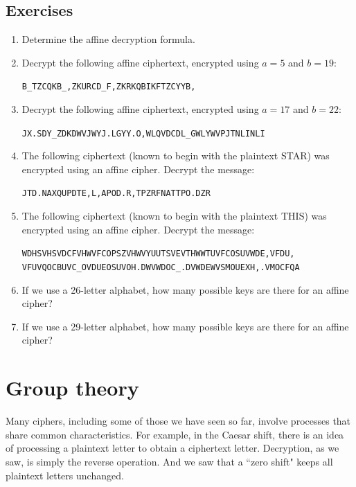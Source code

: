 \documentclass{book}
\theoremstyle{plain}
\theoremstyle{definition}
\newif\ifprintsolutions
\newcommand{\solution}[1]{\ifprintsolutions \begin{sloppypar}{\it #1}\end{sloppypar} \fi} %
\newcommand{\display}[1]{\begin{sloppypar}\setlength{\parindent}{0mm}#1\end{sloppypar}} %
\newcommand{\ciphertextspace}[1]{\begin{sloppypar}\doublespacing\Large\texttt{#1}\end{sloppypar}} %
\renewcommand{\mod}{\operatorname{mod}}
\renewcommand{\mod}{\operatorname{mod}}
\begin{document}
\section{Exercises}
\begin{enumerate}
\item Determine the affine decryption formula. \solution{$P \equiv a^{-1}(C-b) \mod 29$}
\item Decrypt the following affine ciphertext, encrypted using $a = 5$ and $b = 19$:
\display{\ciphertextspace{B\_TZCQKB\_,ZKURCD\_F,ZKRKQBIKFTZCYYB,}} \solution{In a hole in the ground there lived a hobbit.}
\item Decrypt the following affine ciphertext, encrypted using $a = 17$ and $b = 22$:
\display{\ciphertextspace{JX.SDY\_ZDKDWVJWYJ.LGYY.O,WLQVDCDL\_GWLYWVPJTNLINLI}} \solution{Smokey the bear says only you can prevent lanyard swinging.}
\item The following ciphertext (known to begin with the plaintext STAR) was encrypted using an affine cipher. Decrypt the message:
\display{\ciphertextspace{JTD.NAXQUPDTE,L,APOD.R,TPZRFNATTPO.DZR}} \solution{Key $a = 10, b = 3$: Starbuck, what do you hear? Nothing but the rain.}
\item The following ciphertext (known to begin with the plaintext THIS) was encrypted using an affine cipher. Decrypt the message:
\display{\ciphertextspace{WDHSVHSVDCFVHWVFCOPSZVHWVYUUTSVEVTHWWTUVFCOSUVWDE,VFDU,\\VFUVQOCBUVC\_OVDUEOSUVOH.DWVWDOC\_.DVWDEWVSMOUEXH,.VMOCFQA}} \solution{Key $a = b = 4$: This is how it works, it feels a little worse than when we drove our hearse right through that screaming crowd.}
\item If we use a 26-letter alphabet, how many possible keys are there for an affine cipher? \solution{Using the algorithm $C \equiv aP+b \mod 26$, we have $a \in \{1,3,5,7,9,11,15,17,19,21,23,25\}$ and $b \in \{0,\ldots,25\}$, so there are $12 \times 26 = 312$ keys.}
\item If we use a 29-letter alphabet, how many possible keys are there for an affine cipher? \solution{Using the algorithm $C \equiv aP+b \mod 29$, we have $a \in \{1,\ldots,28\}$ and $b \in \{0,\ldots,28\}$, so there are $28 \times 29 = 812$ keys.}
\end{enumerate}

\chapter{Group theory}
Many ciphers, including some of those we have seen so far, involve processes that share common characteristics. For example, in the Caesar shift, there is an idea of processing a plaintext letter to obtain a ciphertext letter. Decryption, as we saw, is simply the reverse operation. And we saw that a ``zero shift" keeps all plaintext letters unchanged.
\end{document}
